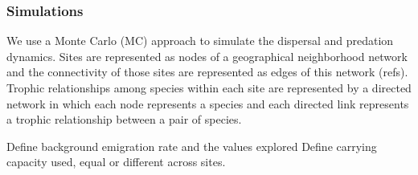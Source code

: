 \subsubsection{Simulations}

We use a Monte Carlo (MC) approach to simulate the dispersal and
predation dynamics. Sites are represented as nodes of a geographical
neighborhood network and the connectivity of those sites are
represented as edges of this network (refs). Trophic relationships
among species within each site are represented by a directed network
in which each node represents a species and each directed link
represents a trophic relationship between a pair of species.

Define background emigration rate and the values explored
Define carrying capacity used, equal or different across sites. 





